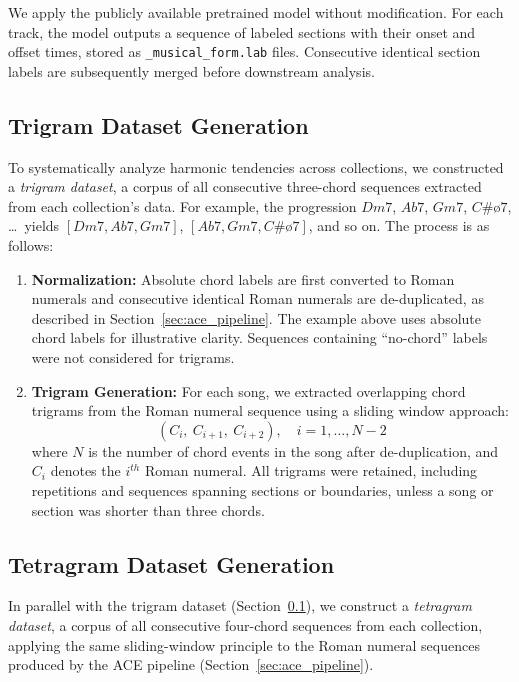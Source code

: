 \documentclass{article}
\begin{document}
We apply the publicly available pretrained model without modification. For each track, the model outputs a sequence of labeled sections with their onset and offset times, stored as \texttt{\_musical\_form.lab} files. Consecutive identical section labels are subsequently merged before downstream analysis.

\subsection{Trigram Dataset Generation}
\label{sec:trigram_generation}
To systematically analyze harmonic tendencies across collections, we constructed a \textit{trigram dataset}, a corpus of all consecutive three-chord sequences extracted from each collection's data.
For example, the progression $Dm7$, $Ab7$, $Gm7$, $C\#ø7$, \ldots\ yields $[Dm7, Ab7, Gm7]$, $[Ab7, Gm7, C\#ø7]$, and so on.
The process is as follows:

\begin{enumerate}
    \item \textbf{Normalization:} Absolute chord labels are first converted to Roman numerals and consecutive identical Roman numerals are de-duplicated, as described in Section~\ref{sec:ace_pipeline}. The example above uses absolute chord labels for illustrative clarity. Sequences containing ``no-chord'' labels were not considered for trigrams.

    \item \textbf{Trigram Generation:}
    For each song, we extracted overlapping chord trigrams from the Roman numeral sequence using a sliding window approach:
    \[
        (C_{i},\ C_{i+1},\ C_{i+2}), \quad i = 1, \ldots, N-2
    \]
    where $N$ is the number of chord events in the song after de-duplication, and $C_i$ denotes the $i^{th}$ Roman numeral. All trigrams were retained, including repetitions and sequences spanning sections or boundaries, unless a song or section was shorter than three chords.
    
\end{enumerate}

\subsection{Tetragram Dataset Generation}
\label{sec:tetragram_generation}

In parallel with the trigram dataset (Section~\ref{sec:trigram_generation}), we construct a \textit{tetragram dataset}, a corpus of all consecutive four-chord sequences from each collection, applying the same sliding-window principle to the Roman numeral sequences produced by the ACE pipeline (Section~\ref{sec:ace_pipeline}).
\end{document}

